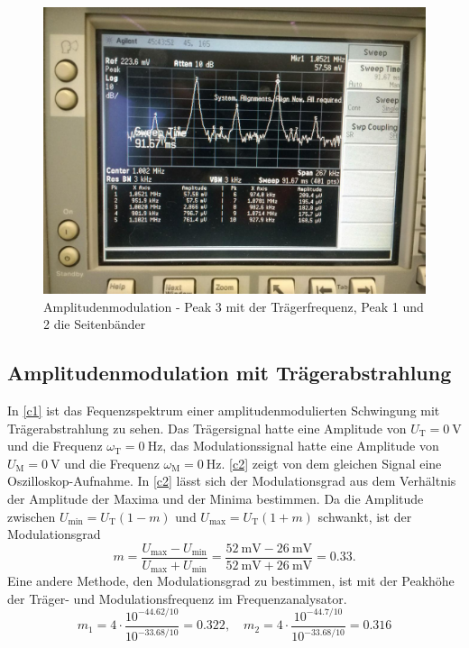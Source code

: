 \begin{figure}
	\centering
	\includegraphics[width=\textwidth]{img/Aufgabenteil_b.jpg}
	\caption{Amplitudenmodulation - Peak 3 mit der Trägerfrequenz, Peak 1 und 2 die Seitenbänder}
	\label{b}
\end{figure}

\subsection{Amplitudenmodulation mit Trägerabstrahlung}

In \autoref{c1} ist das Fequenzspektrum einer amplitudenmodulierten Schwingung mit Trägerabstrahlung zu sehen. Das Trägersignal hatte eine Amplitude von $U_\text{T}=\SI{0}{\volt}$ und die Frequenz $\omega_\text{T}=\SI{0}{\hertz}$, das Modulationssignal hatte eine Amplitude von $U_\text{M}=\SI{0}{\volt}$ und die Frequenz $\omega_\text{M}=\SI{0}{\hertz}$. \autoref{c2} zeigt von dem gleichen Signal eine Oszilloskop-Aufnahme. In \autoref{c2} lässt sich der Modulationsgrad aus dem Verhältnis der Amplitude der Maxima und der Minima bestimmen. Da die Amplitude zwischen $U_\text{min} = U_\text{T}(1 - m)$ und $U_\text{max} = U_\text{T}(1 + m)$ schwankt, ist der Modulationsgrad
\[
	m =\frac{U_\text{max} - U_\text{min}}{U_\text{max} + U_\text{min}} = \frac{\SI{52}{\milli\volt} - \SI{26}{\milli\volt}}{\SI{52}{\milli\volt} + \SI{26}{\milli\volt}} = 0.33.
\]
Eine andere Methode, den Modulationsgrad zu bestimmen, ist mit der Peakhöhe der Träger- und Modulationsfrequenz im Frequenzanalysator.
\[
	m_1 = 4 \cdot \frac{10^{-44.62/10}}{10^{-33.68/10}} = 0.322, \quad m_2 = 4 \cdot \frac{10^{-44.7/10}}{10^{-33.68/10}} = 0.316
\]

